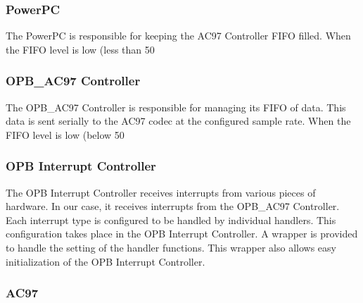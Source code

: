 \documentclass[11pt,letter,oneside]{report}
\begin{document}
\subsubsection{PowerPC}

The PowerPC is responsible for keeping the AC97 Controller FIFO filled.  When the FIFO level is low (less than 50%

\subsubsection{OPB\_AC97 Controller}

The OPB\_AC97 Controller is responsible for managing its FIFO of data.  This data is sent serially to the AC97 codec at the configured sample rate.  When the FIFO level is low (below 50%

\subsubsection{OPB Interrupt Controller}

The OPB Interrupt Controller receives interrupts from various pieces of hardware.  In our case, it receives interrupts from the OPB\_AC97 Controller.  Each interrupt type is configured to be handled by individual handlers.  This configuration takes place in the OPB Interrupt Controller. A wrapper is provided to handle the setting of the handler functions. This wrapper also allows easy initialization of the OPB Interrupt Controller.

\subsubsection{AC97}
\end{document}
